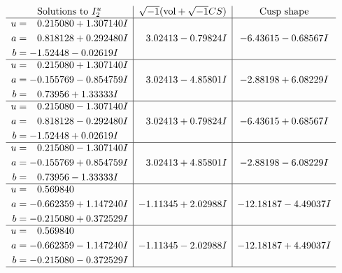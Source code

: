 \documentclass[1p]{elsarticle_modified}
\theoremstyle{definition}
\newcommand{\I}{\sqrt{-1}}
\begin{document}
$$\begin{array}{c|c|c}  
\text{Solutions to }I^u_{2}& \I (\text{vol} + \sqrt{-1}CS) & \text{Cusp shape}\\
 \hline 
\begin{aligned}
u &= \phantom{-}0.215080 + 1.307140 I \\
a &= \phantom{-}0.818128 + 0.292480 I \\
b &= -1.52448 - 0.02619 I\end{aligned}
 & \phantom{-}3.02413 - 0.79824 I & -6.43615 - 0.68567 I \\ \hline\begin{aligned}
u &= \phantom{-}0.215080 + 1.307140 I \\
a &= -0.155769 - 0.854759 I \\
b &= \phantom{-}0.73956 + 1.33333 I\end{aligned}
 & \phantom{-}3.02413 - 4.85801 I & -2.88198 + 6.08229 I \\ \hline\begin{aligned}
u &= \phantom{-}0.215080 - 1.307140 I \\
a &= \phantom{-}0.818128 - 0.292480 I \\
b &= -1.52448 + 0.02619 I\end{aligned}
 & \phantom{-}3.02413 + 0.79824 I & -6.43615 + 0.68567 I \\ \hline\begin{aligned}
u &= \phantom{-}0.215080 - 1.307140 I \\
a &= -0.155769 + 0.854759 I \\
b &= \phantom{-}0.73956 - 1.33333 I\end{aligned}
 & \phantom{-}3.02413 + 4.85801 I & -2.88198 - 6.08229 I \\ \hline\begin{aligned}
u &= \phantom{-}0.569840\phantom{ +0.000000I} \\
a &= -0.662359 + 1.147240 I \\
b &= -0.215080 + 0.372529 I\end{aligned}
 & -1.11345 + 2.02988 I & -12.18187 - 4.49037 I \\ \hline\begin{aligned}
u &= \phantom{-}0.569840\phantom{ +0.000000I} \\
a &= -0.662359 - 1.147240 I \\
b &= -0.215080 - 0.372529 I\end{aligned}
 & -1.11345 - 2.02988 I & -12.18187 + 4.49037 I\\
 \hline 
 \end{array}$$\newpage
\end{document}

